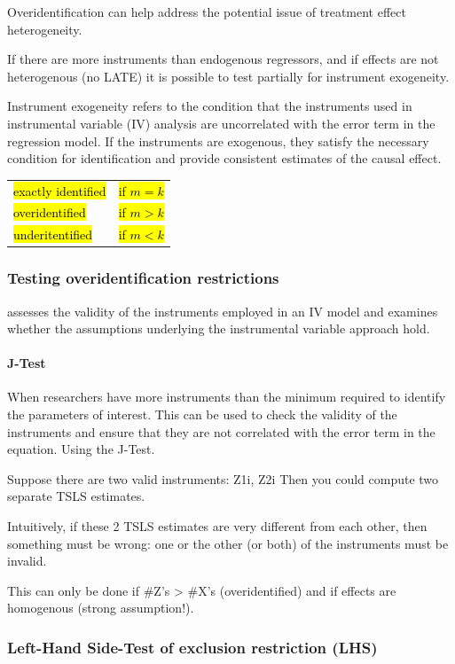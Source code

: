 \documentclass[a3paper, 8pt]{extarticle}
\begin{document}
\begin{multicols*}{5}
Overidentification can help address the potential issue of treatment effect heterogeneity. 

If there are more instruments than endogenous regressors, and if effects are not heterogenous (no LATE) it is possible to test partially for instrument exogeneity.

Instrument exogeneity refers to the condition that the instruments used in instrumental variable (IV) analysis are uncorrelated with the error term in the regression model. If the instruments are exogenous, they satisfy the necessary condition for identification and provide consistent estimates of the causal effect.


\begin{tabular}{l l}
    \hl{exactly identified} & \hl{if $m = k$} \\
    \hl{overidentified} & \hl{if $m > k$} \\
    \hl{underitentified} & \hl{if $m < k$} \\
\end{tabular} 

\subsubsection{Testing overidentification restrictions}
assesses the validity of the instruments employed in an IV model and examines whether the assumptions underlying the instrumental variable approach hold.

\paragraph{J-Test}
When researchers have more instruments than the minimum required to identify the parameters of interest. This can be used to check the validity of the instruments and ensure that they are not correlated with the error term in the equation. Using the J-Test.

Suppose there are two valid instruments: Z1i, Z2i Then you could compute two separate TSLS estimates.

Intuitively, if these 2 TSLS estimates are very different from each other, then something must be wrong: one or the other (or both) of the instruments must be invalid.

This can only be done if #Z's > #X's (overidentified) and if effects are homogenous (strong assumption!).


\subsubsection{Left-Hand Side-Test of exclusion restriction (LHS)}




\end{multicols*}
\end{document}
